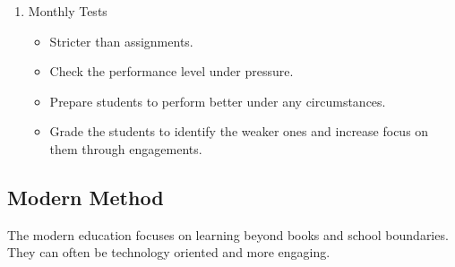 \begin{enumerate}
\begin{itemize}
\end{itemize}

\item Monthly Tests
\begin{itemize}
\item Stricter than assignments.
\item Check the performance level under pressure. 
\item Prepare students to perform better under any circumstances.
\item Grade the students to identify the weaker ones and increase focus on them through engagements.

\end{itemize}
\end{enumerate}

\subsection[Modern]{Modern Method}

The modern education focuses on learning beyond books and school boundaries. They can often be technology oriented and more engaging.


